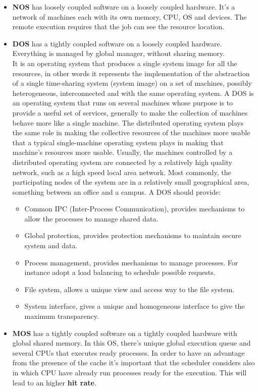 \documentclass[11pt,a4paper]{article}
\begin{document}
\begin{itemize}
	\item \textbf{NOS} has loosely coupled software on a loosely coupled hardware. It’s a network of machines each with its own memory, CPU, OS and devices. The remote execution requires that the job can see the resource location.
	\item \textbf{DOS} has a tightly coupled software on a loosely coupled hardware. Everything is managed by global manager, without sharing memory.\\
	It is an operating system that produces a single system image for all the resources, in other words it represents the implementation of the abstraction of a single time-sharing system (system image) on a set of machines, possibly heterogeneous, interconnected and with the same operating system. 
	A DOS is an operating system that runs on several machines whose purpose is to provide a useful set of services, generally to make the collection of machines behave more like a single machine. The distributed operating system plays the same role in making the collective resources of the machines more usable that a typical single-machine operating system plays in making that machine's resources more usable. Usually, the machines controlled by a distributed operating system are connected by a relatively high quality network, such as a high speed local area network. Most commonly, the participating nodes of the system are in a relatively small geographical area, something between an office and a campus.
	A DOS should provide:
	\begin{itemize}
		\item Common IPC (Inter-Process Communication), provides mechanisms to allow the processes to manage shared data. 
		\item Global protection, provides protection mechanisms to maintain secure system and data.
		\item Process management, provides mechanisms to manage processes. For instance adopt a load balancing to schedule possible requests.
		\item File system, allows a unique view and access way to the file system.
		\item System interface, gives a unique and homogeneous interface to give the maximum transparency.  
	\end{itemize}
	\item \textbf{MOS} has a tightly coupled software on a tightly coupled hardware with global shared memory. In this OS, there’s unique global execution queue and several CPUs that executes ready processes. In order to have an advantage from the presence of the cache it’s important that the scheduler considers also in which CPU have already run processes ready for the execution. This will lead to an higher \textbf{hit rate}.
\end{itemize}
\end{document}
